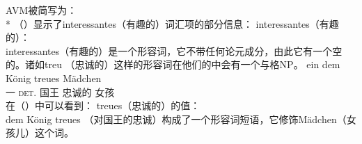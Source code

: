 \ea
AVM被简写为\nbarc：\\*
\z
（）显示了interessantes（有趣的）词汇项的部分信息：
\eas{}
\label{le-interessantes}
interessantes（有趣的）\catvc：\\
\zs
interessantes（有趣的）是一个形容词，它不带任何论元成分，由此它有一个空的\subcatlc。诸如treu （忠诚的）这样的形容词在他们的\subcatlc 中会有一个与格NP。
\ea
\gll ein dem König treues Mädchen\\
	一 \textsc{det}.\dat{} 国王 忠诚的 女孩\\
\z
在（）中可以看到\catvc：
\ea
\label{le-treue}
treues（忠诚的）的\cat 值：\\
\z
dem König treues （对国王的忠诚）构成了一个形容词短语，它修饰Mädchen（女孩儿）这个词。


